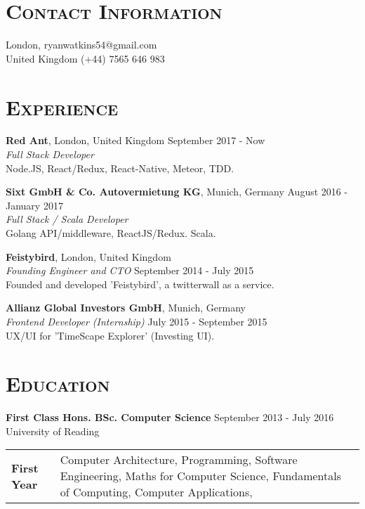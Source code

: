 \documentclass[line, margin, 10pt]{res}
\begin{document}
\renewcommand{\namefont}{ \LARGE \bf }


\begin{resume}

\section{\textsc{Contact Information}}
London,  \hfill {ryanwatkins54@gmail.com}\\
United Kingdom \hfill {(+44) 7565 646 983 }\\

\section{\textsc{Experience}}

{\bf Red Ant}, London, United Kingdom {\hfill September 2017 -  Now}\\
{\it Full Stack Developer} \\
Node.JS, React/Redux, React-Native, Meteor, TDD.

{\bf Sixt GmbH \& Co. Autovermietung KG}, Munich, Germany {\hfill August 2016 - January 2017}\\
{\it Full Stack / Scala Developer} \\
Golang API/middleware, ReactJS/Redux. Scala.

{\bf Feistybird}, London, United Kingdom \\
\textit{Founding Engineer and CTO} \hfill {September 2014 - July 2015}\\
Founded and developed 'Feistybird', a twitterwall as a service.

{\bf Allianz Global Investors GmbH}, Munich, Germany\\
{\it Frontend Developer (Internship)} {\hfill July 2015 - September 2015}\\
UX/UI for 'TimeScape Explorer' (Investing UI).

\section{\textsc{Education}}
{\bf First Class Hons. BSc. Computer Science}  {\hfill September 2013 - July 2016}\\
University of Reading

\begin{tabular}[t]{@{} p{1.2in} p{4.5in} @{}}
\bf{First Year}  & Computer Architecture,
  Programming, 
  Software Engineering,
  Maths for Computer Science,
  Fundamentals of Computing,
  Computer Applications,
\end{tabular}


\end{resume}
\end{document}

